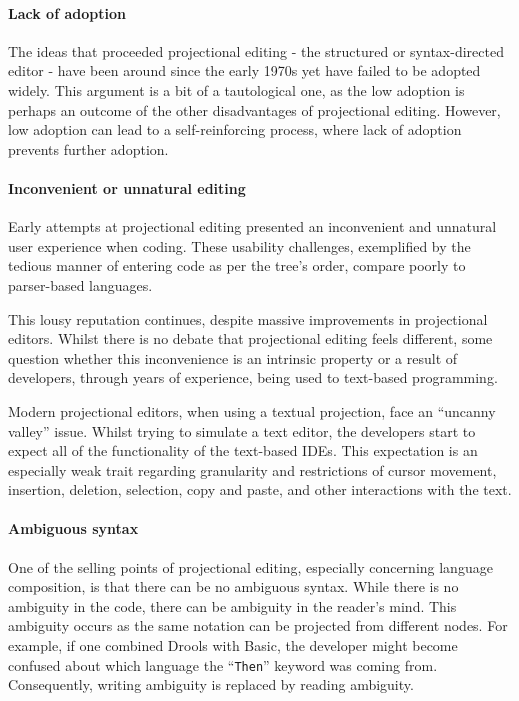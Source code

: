 \paragraph{Lack of adoption} The ideas that proceeded projectional editing - the structured or syntax-directed editor - have been around since the early 1970s yet have failed to be adopted widely.
This argument is a bit of a tautological one, as the low adoption is perhaps an outcome of the other disadvantages of projectional editing.
However, low adoption can lead to a self-reinforcing process, where lack of adoption prevents further adoption.

\paragraph{Inconvenient or unnatural editing} Early attempts at projectional editing presented an inconvenient and unnatural user experience when coding.
These usability challenges, exemplified by the tedious manner of entering code as per the tree's order, compare poorly to parser-based languages.

This lousy reputation continues, despite massive improvements in projectional editors.
Whilst there is no debate that projectional editing feels different, some question whether this inconvenience is an intrinsic property or a result of developers, through years of experience, being used to text-based programming.

Modern projectional editors, when using a textual projection, face an ``uncanny valley'' issue.
Whilst trying to simulate a text editor, the developers start to expect all of the functionality of the text-based IDEs.
This expectation is an especially weak trait regarding granularity and restrictions of cursor movement, insertion, deletion, selection, copy and paste, and other interactions with the text.

\paragraph{Ambiguous syntax} One of the selling points of projectional editing, especially concerning language composition, is that there can be no ambiguous syntax.
While there is no ambiguity in the code, there can be ambiguity in the reader's mind.
This ambiguity occurs as the same notation can be projected from different nodes.
For example, if one combined Drools with Basic, the developer might become confused about which language the ``\texttt{Then}'' keyword was coming from.
Consequently, writing ambiguity is replaced by reading ambiguity.

